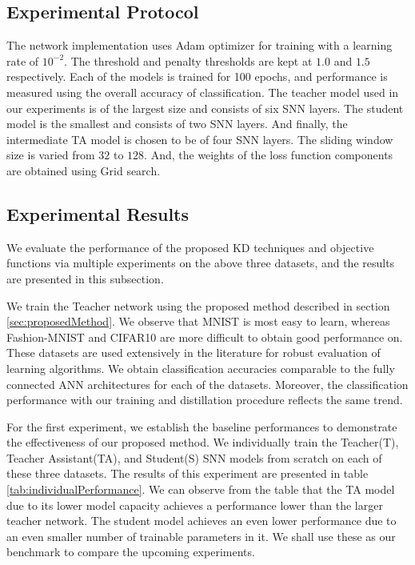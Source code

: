 \documentclass{article}
\begin{document}
\subsection{Experimental Protocol}
The network implementation uses Adam optimizer for training with a learning rate of $10^{-2}$. The threshold and penalty thresholds are kept at $1.0$ and $1.5$ respectively. Each of the models is trained for 100 epochs, and performance is measured using the overall accuracy of classification. The teacher model used in our experiments is of the largest size and consists of six SNN layers. The student model is the smallest and consists of two SNN layers. And finally, the intermediate TA model is chosen to be of four SNN layers. The sliding window size is varied from $32$ to $128$. And, the weights of the loss function components are obtained using Grid search.

\subsection{Experimental Results}
We evaluate the performance of the proposed KD techniques and objective functions via multiple experiments on the above three datasets, and the results are presented in this subsection.

We train the Teacher network using the proposed method described in section \ref{sec:proposedMethod}. We observe that MNIST is most easy to learn, whereas Fashion-MNIST and CIFAR10 are more difficult to obtain good performance on. These datasets are used extensively in the literature for robust evaluation of learning algorithms. We obtain classification accuracies comparable to the fully connected ANN architectures for each of the datasets. Moreover, the classification performance with our training and distillation procedure reflects the same trend.

For the first experiment, we establish the baseline performances to demonstrate the effectiveness of our proposed method. We individually train the Teacher(T), Teacher Assistant(TA), and Student(S) SNN models from scratch on each of these three datasets. The results of this experiment are presented in table \ref{tab:individualPerformance}. We can observe from the table that the TA model due to its lower model capacity achieves a performance lower than the larger teacher network. The student model achieves an even lower performance due to an even smaller number of trainable parameters in it. We shall use these as our benchmark to compare the upcoming experiments.
\end{document}
